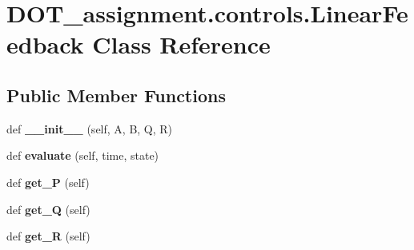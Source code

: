 \hypertarget{class_d_o_t__assignment_1_1controls_1_1_linear_feedback}{}\section{D\+O\+T\+\_\+assignment.\+controls.\+Linear\+Feedback Class Reference}
\label{class_d_o_t__assignment_1_1controls_1_1_linear_feedback}
\subsection*{Public Member Functions}
\begin{DoxyCompactItemize}
\item 
\mbox{\label{class_d_o_t__assignment_1_1controls_1_1_linear_feedback_a3eb8ba3d636124ffb692c3fb04aa1374}} 
def {\bfseries \+\_\+\+\_\+init\+\_\+\+\_\+} (self, A, B, Q, R)
\item 
\mbox{\label{class_d_o_t__assignment_1_1controls_1_1_linear_feedback_a2d6c47ba394899457e6acf0c5f1bf311}} 
def {\bfseries evaluate} (self, time, state)
\item 
\mbox{\label{class_d_o_t__assignment_1_1controls_1_1_linear_feedback_ae23bb9239bde187828e0d57ed51d621f}} 
def {\bfseries get\+\_\+P} (self)
\item 
\mbox{\label{class_d_o_t__assignment_1_1controls_1_1_linear_feedback_ae6a062769c38a4ef5554632e87be30ca}} 
def {\bfseries get\+\_\+Q} (self)
\item 
\mbox{\label{class_d_o_t__assignment_1_1controls_1_1_linear_feedback_a350575b8ab2ca235542a249c42190d2f}} 
def {\bfseries get\+\_\+R} (self)
\end{DoxyCompactItemize}
